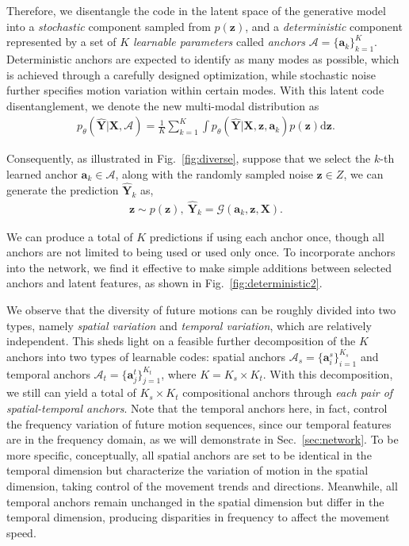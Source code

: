 Therefore, we disentangle the code in the latent space of the generative model into a {\em{stochastic}} component sampled from $p(\mathbf{z})$, and a {\em{deterministic}} component represented by a set of $K$ {\em{learnable parameters}} called {\em anchors} $\mathcal{A} = \{\mathbf a_k\}_{k=1}^K$. Deterministic anchors are expected to identify as many modes as possible, which is achieved through a carefully designed optimization, while stochastic noise further specifies motion variation within certain modes. With this latent code disentanglement, we denote the new multi-modal distribution as
\begin{align}
    p_{\theta}(\mathbf{\widehat Y}|\mathbf{X}, \mathcal{A}) = \frac{1}{K}\sum_{k=1}^K \int p_{\theta}(\mathbf{\widehat Y}|\mathbf{X}, \mathbf z,\mathbf a_k)p(\mathbf z) \mathrm{d} \mathbf z.
\end{align}

Consequently, as illustrated in Fig.~\ref{fig:diverse}{\color{red}{(b)}}, suppose that we select the $k$-th learned anchor $\mathbf a_k \in \mathcal{A}$, along with the randomly sampled noise $\mathbf z \in Z$, we can generate the prediction $\mathbf{\widehat{Y}}_k$ as,
\begin{align}
    \mathbf{z} \sim p(\mathbf z),\ \mathbf{\widehat{Y}}_k = \mathcal{G}(\mathbf{a}_k, \mathbf{z}, \mathbf{X}).
\end{align}

We can produce a total of $K$ predictions if using each anchor once, though all anchors are not limited to being used or used only once. To incorporate anchors into the network, we find it effective to make simple additions between selected anchors and latent features, as shown in Fig.~\ref{fig:deterministic2}.


\label{sec:mmst} We observe that the diversity of future motions can be roughly divided into two types, namely {\em{spatial variation}} and {\em{temporal variation}}, which are relatively independent. This sheds light on a feasible further decomposition of the $K$ anchors into two types of learnable codes: spatial anchors $\mathcal{A}_s = \{\mathbf a^s_i\}_{i=1}^{K_s}$ and temporal anchors $\mathcal{A}_t = \{\mathbf a^t_j\}_{j=1}^{K_t}$, where $K = K_s \times K_t$. 
With this decomposition, we still can yield a total of $K_s \times K_t$ compositional anchors through \textit{each pair of spatial-temporal anchors}.
Note that the temporal anchors here, in fact, control the frequency variation of future motion sequences, since our temporal features are in the frequency domain, as we will demonstrate in Sec.~\ref{sec:network}. 
To be more specific, conceptually, all spatial anchors are set to be identical in the temporal dimension but characterize the variation of motion in the spatial dimension, taking control of the movement trends and directions. Meanwhile, all temporal anchors remain unchanged in the spatial dimension but differ in the temporal dimension, producing disparities in frequency to affect the movement speed. 

